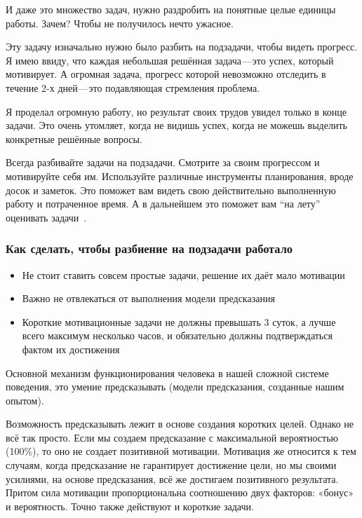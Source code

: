 \documentclass{../industrial-development}
\begin{document}
И даже это множество задач, нужно раздробить на понятные целые единицы работы. Зачем? Чтобы не получилось нечто ужасное.

Эту задачу изначально нужно было разбить на подзадачи, чтобы видеть прогресс. Я имею ввиду, что каждая небольшая решённая задача — это успех, который мотивирует. А огромная задача, прогресс которой невозможно отследить в течение 2-х дней — это подавляющая стремления проблема.

Я проделал огромную работу, но результат своих трудов увидел только в конце задачи. Это очень утомляет, когда не видишь успех, когда не можешь выделить конкретные решённые вопросы.

Всегда разбивайте задачи на подзадачи. Смотрите за своим прогрессом и мотивируйте себя им. Используйте различные инструменты планирования, вроде досок и заметок. Это поможет вам видеть свою действительно выполненную работу и потраченное время. А в дальнейшем это поможет вам “на лету” оценивать задачи~\cite{TasksMedium}.

\begin{frame} \frametitle{Как сделать, чтобы разбиение на подзадачи работало}
  \begin{itemize}
  \item Не стоит ставить совсем простые задачи, решение их даёт мало мотивации
  \item Важно не отвлекаться от выполнения модели предсказания
  \item Короткие мотивационные задачи не должны превышать 3 суток, а лучше всего максимум несколько часов, и обязательно должны подтверждаться фактом их достижения
  \end{itemize}
\end{frame}

\lecturenotes

Основной механизм функционирования человека в нашей сложной системе поведения, это умение предсказывать (модели предсказания, созданные нашим опытом). 

Возможность предсказывать лежит в основе создания коротких целей. Однако не всё так просто.
Если мы создаем предсказание с максимальной вероятностью (100\%), то оно не создает позитивной мотивации.
Мотивация же относится к тем случаям, когда предсказание не гарантирует достижение цели, но мы своими усилиями, на основе предсказания, всё же достигаем позитивного результата. Притом сила мотивации пропорциональна соотношению двух факторов: «бонус» и вероятность.
Точно также действуют и короткие задачи.
\end{document}
